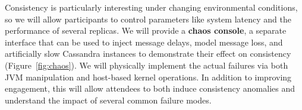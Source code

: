 Consistency is particularly interesting under changing environmental
conditions, so we will allow participants to control parameters like
system latency and the performance of several replicas. We will provide
a \textbf{chaos console}, a separate interface that can be used to
inject message delays, model message loss, and artificially
slow Cassandra instances to demonstrate their effect on consistency
(Figure~\ref{fig:chaos}). We will physically implement the actual failures via
both JVM manipulation and host-based kernel operations. In addition to
improving engagement, this will allow attendees to both induce
consistency anomalies and understand the impact of several common
failure modes.
